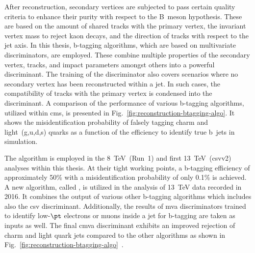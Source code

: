 After reconstruction, secondary vertices are subjected to pass certain quality criteria to enhance their purity with respect to the B~meson hypothesis. These are based on the amount of shared tracks with the primary vertex, the invariant vertex mass to reject kaon decays, and the direction of tracks with respect to the jet axis. In this thesis, b-tagging algorithms, which are based on multivariate discriminators, are employed. These combine multiple properties of the secondary vertex, tracks, and impact parameters amongst others into a powerful discriminant. The training of the discriminator also covers scenarios where no secondary vertex has been reconstructed within a jet. In such cases, the compatibility of tracks with the primary vertex is condensed into the discriminant. A comparison of the performance of various b-tagging algorithms, utilized within \gls{cms}, is presented in Fig.~\ref{fig:reconstruction-btagging-algo}. It shows the misidentification probability of falsely tagging charm and light~(g,u,d,s) quarks as a function of the efficiency to identify true b~jets in simulation.


The  algorithm is employed in the 8~TeV~(Run~1) and first 13~TeV~(\gls{csv}v2) analyses within this thesis.  At their tight working points, a b-tagging efficiency of approximately 50\% with a misidentification probability of only 0.1\% is achieved. A new algorithm, called , is utilized in the analysis of 13~TeV data recorded in 2016. It combines the output of various other b-tagging algorithms which includes also the \gls{csv} discriminant. Additionally, the results of \gls{mva} discriminators trained to identify low-$\pt$ electrons or muons inside a jet for b-tagging are taken as inputs as well. The final \gls{cmva} discriminant exhibits an improved rejection of charm and light quark jets compared to the other algorithms as shown in Fig.~\ref{fig:reconstruction-btagging-algo}~\cite{CMS-PAS-BTV-15-001}.

